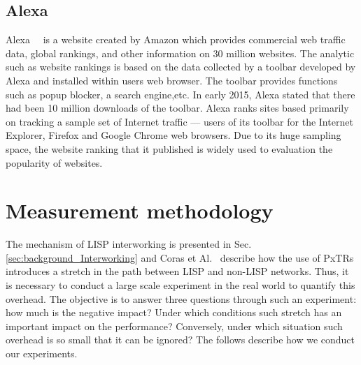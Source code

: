 \subsection{Alexa}
\label{subsec:alexa}
Alexa~\cite{alexa}~\cite{alexatop} is a website created by Amazon which provides commercial web traffic data, global rankings, and other information on 30 million websites. The analytic such as website rankings is based on the data collected by a toolbar developed by Alexa and installed within users web browser. The toolbar provides functions such as popup blocker, a search engine,etc. In early 2015, Alexa stated that there had been 10 million downloads of the toolbar.
Alexa ranks sites based primarily on tracking a sample set of Internet traffic — users of its toolbar for the Internet Explorer, Firefox and Google Chrome web browsers. Due to its huge sampling space, the website ranking that it published is widely used to evaluation the popularity of websites.


\section{Measurement methodology}
\label{sec:pxtr_methodology}
The mechanism of LISP interworking is presented in Sec.\ref{sec:background_Interworking} and Coras et Al.~\cite{coras2014performance} describe how the use of PxTRs introduces a stretch in the path between LISP and non-LISP networks. Thus, it is necessary to conduct a large scale experiment in the real world to quantify this overhead. The objective is to answer three questions through such an experiment: how much is the negative impact? Under which conditions such stretch has an important impact on the performance? Conversely, under which situation such overhead is so small that it can be ignored? The follows describe how we conduct our experiments.


